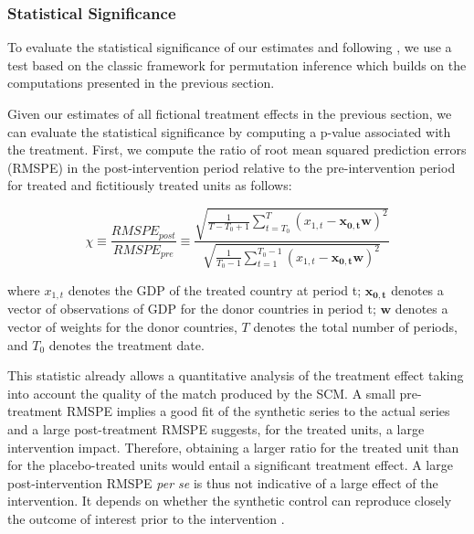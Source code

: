\documentclass[12pt]{article}
\renewcommand{\vec}[1]{\mathbf{#1}}
\begin{document}
\subsubsection{Statistical Significance \label{SS_stat}}

To evaluate the statistical significance of our estimates and following \cite{Abadie2010, Abadie2018}, we use a test based on the classic framework for permutation inference which builds on the computations presented in the previous section.

Given our estimates of all fictional treatment effects in the previous section, we can evaluate the statistical significance by computing a p-value associated with the treatment. First, we compute the ratio of root mean squared prediction errors (RMSPE) in the post-intervention period relative to the pre-intervention period for treated and fictitiously treated units as follows:

\begin{equation}
    \label{EQ_test}
    \chi \equiv \frac{RMSPE_{post}}{RMSPE_{pre}}  \equiv \frac{\sqrt{\frac{1}{T-T_0+1} \sum\limits_{t=T_0}^{T} (x_{1,t} - \vec{x_{0,t}} \vec{w})^2}}{\sqrt{\frac{1}{T_0-1} \sum\limits_{t=1}^{T_0-1} (x_{1,t} - \vec{x_{0,t}} \vec{w})^2}}
\end{equation}

where $x_{1,t}$ denotes the GDP of the treated country at period t; $\vec{x_{0,t}}$ denotes a vector of observations of GDP for the donor countries in period t; $\vec{w}$ denotes a vector of weights for the donor countries, $T$ denotes the total number of periods, and $T_0$ denotes the treatment date. 

This statistic already allows a quantitative analysis of the treatment effect taking into account the quality of the match produced by the SCM. A small pre-treatment RMSPE implies a good fit of the synthetic series to the actual series and a large post-treatment RMSPE suggests, for the treated units, a large intervention impact. Therefore, obtaining a larger ratio for the treated unit than for the placebo-treated units would entail a significant treatment effect. A large post-intervention RMSPE \textit{per se} is thus not indicative of a large effect of the intervention. It depends on whether the synthetic control can reproduce closely the outcome of interest prior to the intervention \citep{Abadie2019}.
\end{document}

